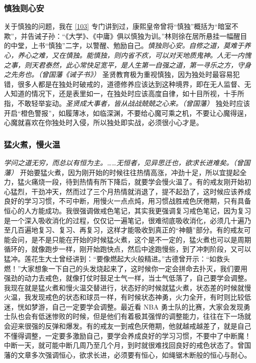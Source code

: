 \subsubsection{慎独则心安}

关于慎独的问题，我在 \ref{103} 专门讲到过，康熙皇帝曾将“慎独”概括为“暗室不欺”，并告诫子孙：“《大学》、《中庸》俱以慎独为训。”林则徐在居所悬挂一幅醒目的中堂，上书“慎独”二字，以警醒、勉励自己。\textit{慎独则心安。自修之道，莫难于养心，养心之难，又在慎独。能慎独，则内省不疚，可以对天地质鬼神。人无一内愧之事，则天君泰然，此心常快足宽平，是人生第一自强之道，第一寻乐之方，守身之先务也。（曾国藩《诫子书》）} 圣贤教育极为重视慎独，因为独处时最容易犯错，很多人都是在独处时破戒的，道德修养应该达到这种境界，即在无人监督、无人知道的情况下，还是表里如一，在独处时应该高度自律，如十目所视，十手所指，不敢轻举妄动。\textit{圣贤成大事者，皆从战战兢兢之心来。（曾国藩）} 独处时应该开启“橙色警报”，如履薄冰，如临深渊，不要给心魔可乘之机，不要让心魔得逞，心魔就喜欢在你独处时入侵，所以独处即实战，必须很小心才是。

\subsubsection{猛火煮，慢火温}

\textit{学问之道无穷，而总以有恒为主。……无恒者，见异思迁也，欲求长进难矣。（曾国藩）} 开始要猛火煮，因为刚开始的时候往往热情高涨，冲劲十足，所以宜提起全力，猛火痛烧一段，待到热情有所下降后，就要学会慢火温了。有的戒友刚开始初心猛烈，干劲冲天，然而过了三个月热情就消退了，提不起劲了，这时候应该养成良好的学习习惯，不可中断，用慢火一点点炖，用习惯战胜戒色厌倦期，只有具备恒心的人方能成功。我很强调做戒色笔记，其实我更强调复习戒色笔记，因为复习是一个深入吸收消化的过程，仅仅记一遍笔记，很难彻底吸收消化，必须几十遍乃至几百遍地复习、复习、再复习，这样才能吸收到真正的“神髓”部分。有的戒友可能会问，是不是只能在开始的时候猛火煮，这个是不一定的，猛火煮也可以是周期循环的，就像跑步一样，刚开始跑快点，然后中途跑慢些，到了冲刺阶段，又可以猛冲。莲花生大士曾经讲到：“要像燃起大火般精进。”古德曾开示：“如救头燃！”大家想象一下自己的头发烧起来了，这时候你一定会拼命去扑灭，我们要用强劲的动力去戒色，就像打仗时鼓足士气一样，当士气低落了，自己要学会调整。我现在就是猛火煮和慢火温交替进行，状态好的时候就猛火煮，状态差的时候就慢火温，我发现戒色的状态和球员一样，有时候状态神勇，火力全开，有时则比较低迷，恍如梦游，自己一定要学会调整。最近看 NBA 勇士队的比赛，大家会发现勇士队也会有低迷惨败的时候，但是他们有着极其强悍的调整能力，往往在下一场就会迎来很强的反弹和爆发。有的戒友一到戒色厌倦期，他就越戒越差了，就是自己不懂得调整，一定要多激励自己，要学会养成良好的学习习惯，不要中了中断魔！中断一天，就可能中断几周乃至几个月，到时就很难找回良好的戒色状态了。曾国藩的文章多次强调恒心，欲求长进，必须要有恒心，如绳锯木断般的恒心与耐心。

